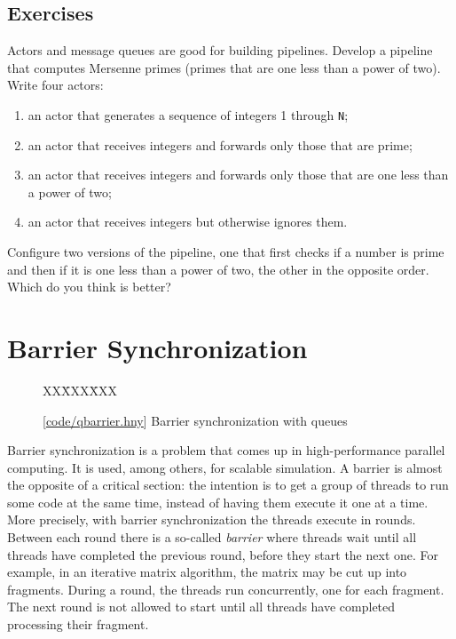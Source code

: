 \documentclass{report}
\newcommand{\harmonysource}[1]{
\begin{tabbing}
XX\=XXX\=XXX\kill
    
\end{tabbing}
}
\newcommand{\harmonylink}[1]{%
[\href{https://harmony.cs.cornell.edu/#1}{\underline{#1}}]%
}
\newenvironment{code}{
\tcolorbox
}{
\endtcolorbox
}
\begin{document}
\section*{Exercises}
\begin{problems}
\item Actors and message queues are good for building pipelines.
Develop a pipeline that computes Mersenne primes (primes that are one less
than a power of two).  Write four actors:
\begin{enumerate}
\item an actor that generates a sequence of integers 1 through \texttt{N};
\item an actor that receives integers and forwards only those that are prime;
\item an actor that receives integers and forwards only those that are one
less than a power of two;
\item an actor that receives integers but otherwise ignores them.
\end{enumerate}
Configure two versions of the pipeline, one that first checks if a number
is prime and then if it is one less than a power of two, the other
in the opposite order.  Which do you think is better?
\end{problems}

\chapter{Barrier Synchronization}
\label{ch:barrier}
%

%

\begin{figure}
\begin{code}
\harmonysource{qbarrier}
\end{code}
\caption{\harmonylink{code/qbarrier.hny} Barrier synchronization with queues}
\label{fig:barrier}
\end{figure}

Barrier synchronization is a problem that comes up in high-performance
parallel computing.
It is used, among others, for scalable simulation.
A barrier is almost the opposite of a critical section:
the intention is to get a group of threads to run some code at the
same time, instead of having them execute it one at a time.
More precisely, with barrier synchronization the threads execute in rounds.
Between each round there is a so-called \emph{barrier} where threads wait
until all threads have completed the previous round, before they start the
next one.
For example, in an iterative matrix algorithm, the matrix may be
cut up into fragments.  During a round, the threads run concurrently,
one for each fragment.  The next round is not allowed to start
until all threads have completed processing their fragment.
\end{document}
